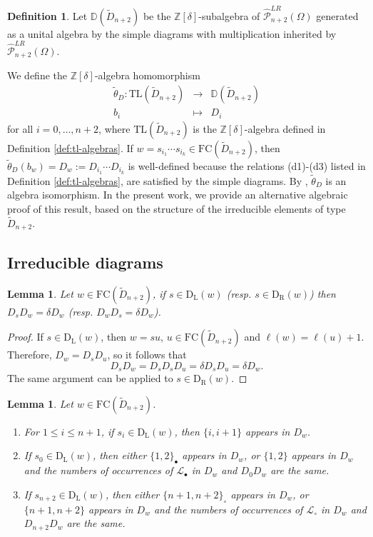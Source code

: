 \documentclass{amsart}
\newcommand{\D}{{\widetilde{D}_{n+2}}}
\newcommand{\Di}{{\mathbb D}}
\newcommand{\ld}{{\mathrm{D}_{\mathrm{L}}}}
\newcommand{\rd}{{\mathrm{D}_{\mathrm{R}}}}
\newcommand{\tl}{{\mathrm{TL}}}
\newcommand{\fc}{{\mathrm{FC}}}
\newcommand{\bO}{{\mathcal{L}_{\bullet}}}
\newcommand{\wO}{{\mathcal{L}_{\circ}}}
\newcommand{\PLRn}{\widehat{\mathcal{P}}^{LR}_{n+2}(\Omega)}
\newcommand{\Zd}{\mathbb{Z}[\delta]}
\newtheorem{Lemma}[Theorem]{Lemma}
\theoremstyle{definition}
\newtheorem{Definition}[Theorem]{Definition}
\begin{document}
\begin{Definition}
Let $\Di(\D)$ be the $\Zd$-subalgebra of $\PLRn$ generated as a unital algebra by the simple diagrams with multiplication inherited by $\PLRn$.
\end{Definition}


We define the $\Zd$-algebra homomorphism 
\begin{eqnarray}
    \tilde{\theta}_D: \tl(\D) & \longrightarrow & \Di(\D) \\
    b_i &\mapsto & D_i \nonumber
\end{eqnarray} 
for all $i=0,\ldots,n+2$, where $\tl(\D)$ is the $\Zd$-algebra defined in Definition \ref{def:tl-algebras}. If $w=s_{i_1}\cdots s_{i_k}\in \fc(\D)$, then $\tilde{\theta}_D(b_w)=D_w:=D_{i_1}\cdots D_{i_k}$ is well-defined because the relations (d1)-(d3) listed in Definition \ref{def:tl-algebras}, are satisfied by the simple diagrams. By \cite[Theorem 5.14]{BFS}, $\tilde{\theta}_D$ is an algebra isomorphism.
In the present work, we provide an alternative algebraic proof of this result, based on the structure of the irreducible elements of type~$\D$.


\subsection{Irreducible diagrams}
\begin{Lemma}
\label{discesadelta}
Let $w\in \fc(\D)$, if $s\in \ld(w)$ (resp. $s\in \rd(w)$) then $D_sD_w=\delta D_w$ (resp. $D_wD_s=\delta D_w$).
\end{Lemma}

\begin{proof}
If $s\in \ld(w)$, then $w=su$, $u\in \fc(\D)$ and $\ell(w)=\ell(u)+1$. Therefore, $D_w=D_sD_u$, so it follows that \[D_sD_w=D_sD_sD_u=\delta D_sD_u=\delta D_w.\] The same argument can be applied to $s\in \rd(w)$. 
\end{proof}


\begin{Lemma}
\label{discesearchi}
Let $w \in \fc(\D)$. 
\begin{enumerate}
    \item[(a)] For $1\le i\le n+1$, if $s_i \in \ld(w)$, then $\{i,i+1\}$ appears in $D_w$.
    \item[(b)] If $s_0 \in \ld(w)$, then either $\{1,2\}_{\bullet}$ appears in $D_w$, or $\{1,2\}$ appears in $D_w$ and the numbers of occurrences of $\bO$ in $D_w$ and $D_{0}D_{w}$ are the same. 
    \item[(c)] If $s_{n+2} \in \ld(w)$, then either $\{n+1,n+2\}_{\circ}$ appears in $D_w$, or $\{n+1,n+2\}$ appears in $D_w$ and the numbers of occurrences of $\wO$ in $D_w$ and $D_{n+2}D_{w}$ are the same.
\end{enumerate}
\end{Lemma}
\end{document}
